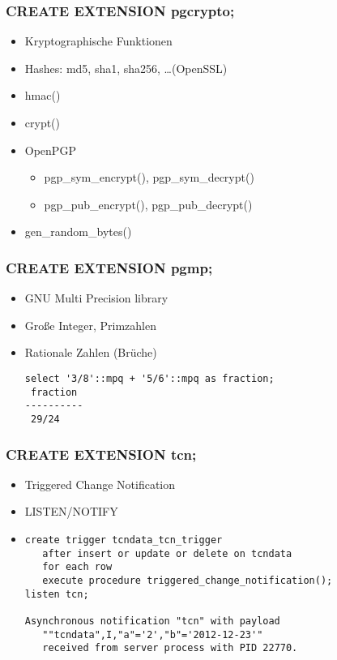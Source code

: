\documentclass[utf8,hyperref={pdftex,colorlinks,linkcolor=black,citecolor=black,urlcolor=black,filecolor=black,plainpages=false},xcolor=table,hyperref]{beamer}
\begin{document}
\begin{frame}[containsverbatim]
	\frametitle{CREATE EXTENSION pgcrypto;}
	\begin{itemize}
		\item Kryptographische Funktionen
		\item Hashes: md5, sha1, sha256, \dots (OpenSSL)
		\item hmac()
		\item crypt()
		\item OpenPGP
			\begin{itemize}
				\item pgp_sym_encrypt(), pgp_sym_decrypt()
				\item pgp_pub_encrypt(), pgp_pub_decrypt()
			\end{itemize}
		\item gen_random_bytes()
	\end{itemize}
\end{frame}

\begin{frame}[containsverbatim]
	\frametitle{CREATE EXTENSION pgmp;}
	\begin{itemize}
		\item GNU Multi Precision library
		\item Große Integer, Primzahlen
		\item Rationale Zahlen (Brüche)
	\begin{verbatim}
select '3/8'::mpq + '5/6'::mpq as fraction;
 fraction 
----------
 29/24
 \end{verbatim}
 \end{itemize}
\end{frame}

\begin{frame}[containsverbatim]
	\frametitle{CREATE EXTENSION tcn;}
	\begin{itemize}
		\item Triggered Change Notification
		\item LISTEN/NOTIFY
		\item \begin{verbatim}
create trigger tcndata_tcn_trigger
   after insert or update or delete on tcndata
   for each row
   execute procedure triggered_change_notification();
listen tcn;

Asynchronous notification "tcn" with payload
   ""tcndata",I,"a"='2',"b"='2012-12-23'"
   received from server process with PID 22770.
\end{verbatim}
\end{itemize}
\end{frame}
\end{document}
